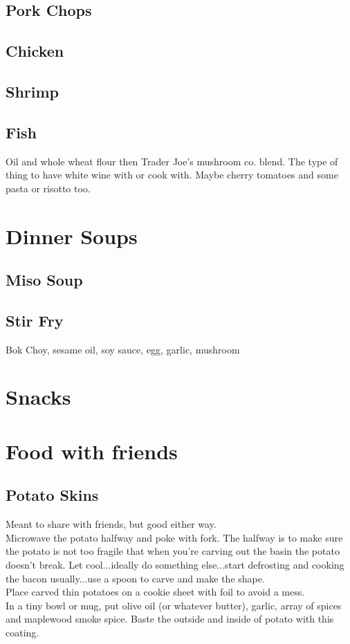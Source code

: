 \documentclass{article}
\begin{document}
\subsection*{Pork Chops}

\subsection*{Chicken}

\subsection*{Shrimp}

\subsection*{Fish}
Oil and whole wheat flour then Trader Joe's mushroom co. blend. The type of thing to have white wine with or cook with. Maybe cherry tomatoes and some pasta or risotto too. 

\section{Dinner Soups} 

\subsection*{Miso Soup}

\subsection*{Stir Fry}
Bok Choy, sesame oil, soy sauce, egg, garlic, mushroom 
\section*{Snacks}


\section*{Food with friends}

\subsection*{Potato Skins} 
Meant to share with friends, but good either way. \\

Microwave the potato halfway and poke with fork. The halfway is to make sure the potato is not too fragile that when you're carving out the basin the potato doesn't break. Let cool...ideally do something else...start defrosting and cooking the bacon usually...use a spoon to carve and make the shape. \\ 
Place carved thin potatoes on a cookie sheet with foil to avoid a mess. \\
In a tiny bowl or mug, put olive oil (or whatever butter), garlic, array of spices and maplewood smoke spice. Baste the outside and inside of potato with this coating. 
\end{document}
